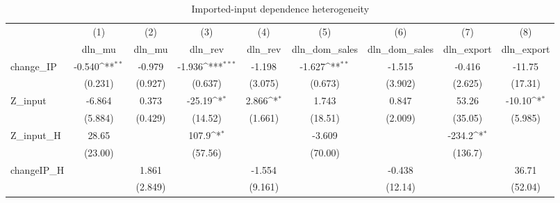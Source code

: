 \begin{table}[htbp]\centering
\def\sym#1{\ifmmode^{#1}\else\(^{#1}\)\fi}
\caption{Imported-input dependence heterogeneity}
\begin{tabular}{l*{8}{c}}
\hline\hline
            &\multicolumn{1}{c}{(1)}&\multicolumn{1}{c}{(2)}&\multicolumn{1}{c}{(3)}&\multicolumn{1}{c}{(4)}&\multicolumn{1}{c}{(5)}&\multicolumn{1}{c}{(6)}&\multicolumn{1}{c}{(7)}&\multicolumn{1}{c}{(8)}\\
            &\multicolumn{1}{c}{dln\_mu}&\multicolumn{1}{c}{dln\_mu}&\multicolumn{1}{c}{dln\_rev}&\multicolumn{1}{c}{dln\_rev}&\multicolumn{1}{c}{dln\_dom\_sales}&\multicolumn{1}{c}{dln\_dom\_sales}&\multicolumn{1}{c}{dln\_export}&\multicolumn{1}{c}{dln\_export}\\
\hline
change\_IP   &      -0.540\sym{**} &      -0.979         &      -1.936\sym{***}&      -1.198         &      -1.627\sym{**} &      -1.515         &      -0.416         &      -11.75         \\
            &     (0.231)         &     (0.927)         &     (0.637)         &     (3.075)         &     (0.673)         &     (3.902)         &     (2.625)         &     (17.31)         \\
[1em]
Z\_input     &      -6.864         &       0.373         &      -25.19\sym{*}  &       2.866\sym{*}  &       1.743         &       0.847         &       53.26         &      -10.10\sym{*}  \\
            &     (5.884)         &     (0.429)         &     (14.52)         &     (1.661)         &     (18.51)         &     (2.009)         &     (35.05)         &     (5.985)         \\
[1em]
Z\_input\_H   &       28.65         &                     &       107.9\sym{*}  &                     &      -3.609         &                     &      -234.2\sym{*}  &                     \\
            &     (23.00)         &                     &     (57.56)         &                     &     (70.00)         &                     &     (136.7)         &                     \\
[1em]
changeIP\_H  &                     &       1.861         &                     &      -1.554         &                     &      -0.438         &                     &       36.71         \\
            &                     &     (2.849)         &                     &     (9.161)         &                     &     (12.14)         &                     &     (52.04)         \\

\end{tabular}
\end{table}
